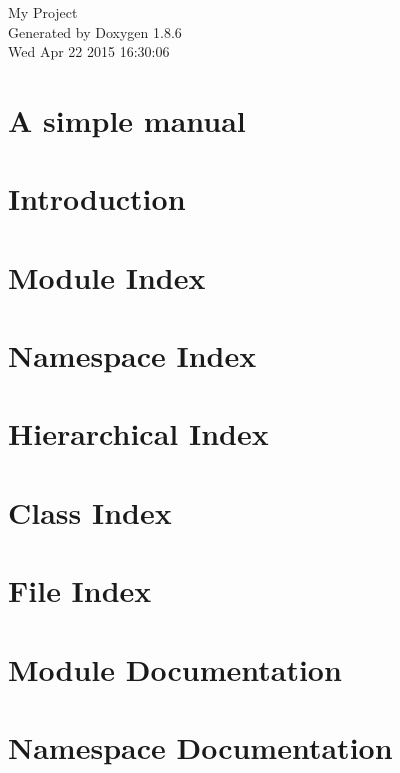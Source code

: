 \documentclass[twoside]{book}
\newcommand{\clearemptydoublepage}{%
  \newpage{\pagestyle{empty}\cleardoublepage}%
}
\begin{document}
\hypersetup{pageanchor=false}
\begin{titlepage}
\vspace*{7cm}
\begin{center}%
{\Large My Project }\\
\vspace*{1cm}
{\large Generated by Doxygen 1.8.6}\\
\vspace*{0.5cm}
{\small Wed Apr 22 2015 16:30:06}\\
\end{center}
\end{titlepage}
\clearemptydoublepage
\tableofcontents
\clearemptydoublepage
{}
\hypersetup{pageanchor=true}

\chapter{A simple manual}
\label{index}\hypertarget{index}{}
\chapter{Introduction}
\label{intro}
\hypertarget{intro}{}

\chapter{Module Index}

\chapter{Namespace Index}

\chapter{Hierarchical Index}

\chapter{Class Index}

\chapter{File Index}

\chapter{Module Documentation}



\chapter{Namespace Documentation}






\end{document}
